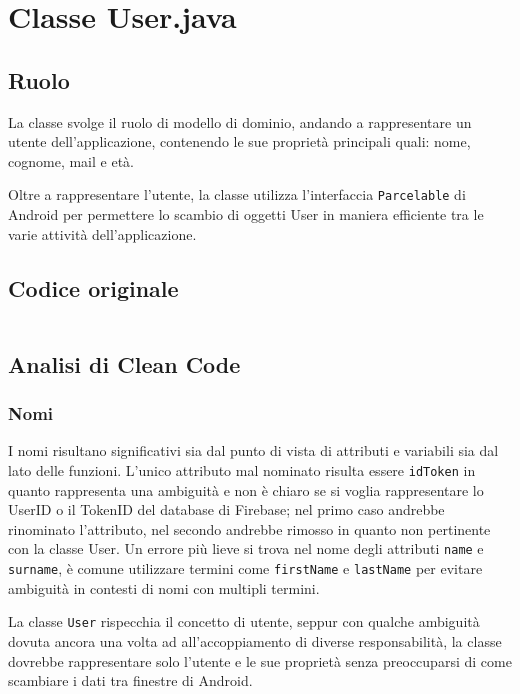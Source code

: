 \section{Classe User.java}
    \subsection{Ruolo}
    La classe svolge il ruolo di modello di dominio, andando a rappresentare un utente dell'applicazione, contenendo le sue proprietà principali quali: nome,  cognome, mail e età.

    Oltre a rappresentare l'utente, la classe utilizza l'interfaccia \texttt{Parcelable} di Android per permettere lo scambio di oggetti User in maniera efficiente tra le varie attività dell'applicazione.

    \subsection{Codice originale}
    \inputminted[linenos, frame=lines]{java}{../old/User.java}

    \subsection{Analisi di Clean Code}
        \subsubsection{Nomi}      
        I nomi risultano significativi sia dal punto di vista di attributi e variabili sia dal lato delle funzioni.
        L'unico attributo mal nominato risulta essere \texttt{idToken} in quanto rappresenta una ambiguità e non è chiaro se si voglia rappresentare lo UserID o il TokenID del database di Firebase;
        nel primo caso andrebbe rinominato l'attributo, nel secondo andrebbe rimosso in quanto non pertinente con la classe User.
        Un errore più lieve si trova nel nome degli attributi \texttt{name} e \texttt{surname}, è comune utilizzare termini come \texttt{firstName} e \texttt{lastName} 
        per evitare ambiguità in contesti di nomi con multipli termini.
        
        La classe \texttt{User} rispecchia il concetto di utente, seppur con qualche ambiguità dovuta ancora una volta ad all'accoppiamento di diverse responsabilità,
        la classe dovrebbe rappresentare solo l'utente e le sue proprietà senza preoccuparsi di come scambiare i dati tra finestre di Android.

